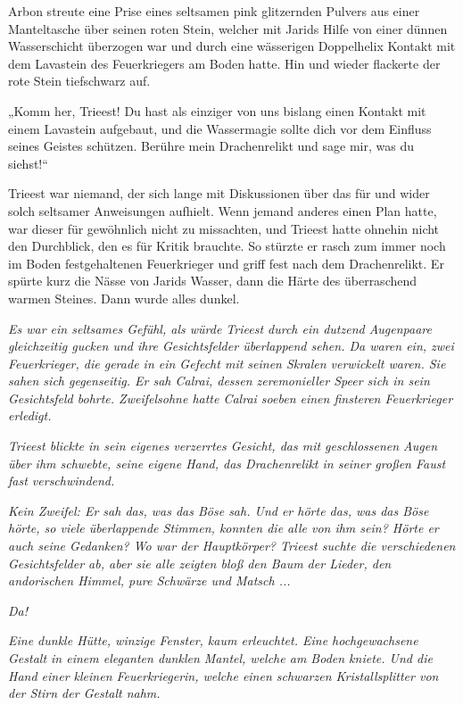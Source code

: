 Arbon streute eine Prise eines seltsamen pink glitzernden Pulvers aus einer Manteltasche über seinen roten Stein, welcher mit Jarids Hilfe von einer dünnen Wasserschicht überzogen war und durch eine wässerigen Doppelhelix Kontakt mit dem Lavastein des Feuerkriegers am Boden hatte. Hin und wieder flackerte der rote Stein tiefschwarz auf.

„Komm her, Trieest! Du hast als einziger von uns bislang einen Kontakt mit einem Lavastein aufgebaut, und die Wassermagie sollte dich vor dem Einfluss seines Geistes schützen. Berühre mein Drachenrelikt und sage mir, was du siehst!“

Trieest war niemand, der sich lange mit Diskussionen über das für und wider solch seltsamer Anweisungen aufhielt. Wenn jemand anderes einen Plan hatte, war dieser für gewöhnlich nicht zu missachten, und Trieest hatte ohnehin nicht den Durchblick, den es für Kritik brauchte. So stürzte er rasch zum immer noch im Boden festgehaltenen Feuerkrieger und griff fest nach dem Drachenrelikt. Er spürte kurz die Nässe von Jarids Wasser, dann die Härte des überraschend warmen Steines. Dann wurde alles dunkel.



\trennzeichen



\textit{Es war ein seltsames Gefühl, als würde Trieest durch ein dutzend Augenpaare gleichzeitig gucken und ihre Gesichtsfelder überlappend sehen. Da waren ein, zwei Feuerkrieger, die gerade in ein Gefecht mit seinen Skralen verwickelt waren. Sie sahen sich gegenseitig. Er sah Calrai, dessen zeremonieller Speer sich in sein Gesichtsfeld bohrte. Zweifelsohne hatte Calrai soeben einen finsteren Feuerkrieger erledigt.}

\textit{Trieest blickte in sein eigenes verzerrtes Gesicht, das mit geschlossenen Augen über ihm schwebte, seine eigene Hand, das Drachenrelikt in seiner großen Faust fast verschwindend.}

\textit{Kein Zweifel: Er sah das, was das Böse sah. Und er hörte das, was das Böse hörte, so viele überlappende Stimmen, konnten die alle von ihm sein? Hörte er auch seine Gedanken? Wo war der Hauptkörper? Trieest suchte die verschiedenen Gesichtsfelder ab, aber sie alle zeigten bloß den Baum der Lieder, den andorischen Himmel, pure Schwärze und Matsch ...}

\textit{Da!}

\textit{Eine dunkle Hütte, winzige Fenster, kaum erleuchtet. Eine hochgewachsene Gestalt in einem eleganten dunklen Mantel, welche am Boden kniete. Und die Hand einer kleinen Feuerkriegerin, welche einen schwarzen Kristallsplitter von der Stirn der Gestalt nahm.}

